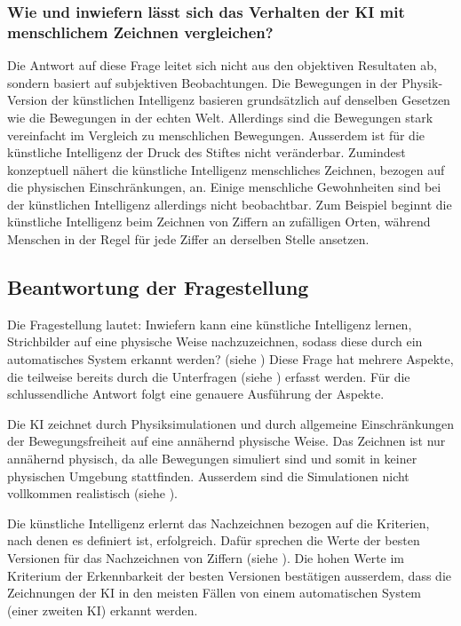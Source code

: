  
\subsubsection*{Wie und inwiefern lässt sich das Verhalten der KI mit menschlichem Zeichnen vergleichen?}\label{subsub:d_frage_unter_6}
Die Antwort auf diese Frage leitet sich nicht aus den objektiven Resultaten ab,
sondern basiert auf subjektiven Beobachtungen. Die Bewegungen in der
Physik-Version der künstlichen Intelligenz basieren grundsätzlich auf denselben
Gesetzen wie die Bewegungen in der echten Welt. Allerdings sind die Bewegungen
stark vereinfacht im Vergleich zu menschlichen Bewegungen. Ausserdem ist für die
künstliche Intelligenz der Druck des Stiftes nicht veränderbar. Zumindest
konzeptuell nähert die künstliche Intelligenz menschliches Zeichnen,
bezogen auf die physischen Einschränkungen, an. Einige menschliche Gewohnheiten
sind bei der künstlichen Intelligenz allerdings nicht beobachtbar. Zum Beispiel
beginnt die künstliche Intelligenz beim Zeichnen von Ziffern an zufälligen
Orten, während Menschen in der Regel für jede Ziffer an derselben Stelle
ansetzen.
 
 
\subsection{Beantwortung der Fragestellung}\label{sub:d_frage_frag}
Die Fragestellung lautet: Inwiefern kann eine künstliche Intelligenz lernen,
Strichbilder auf eine physische Weise nachzuzeichnen, sodass diese durch ein
automatisches System erkannt werden? (siehe ) Diese Frage
hat mehrere Aspekte, die teilweise bereits durch die Unterfragen (siehe
) erfasst werden. Für die schlussendliche Antwort
folgt eine genauere Ausführung der Aspekte.
 
Die KI zeichnet durch Physiksimulationen und durch allgemeine Einschränkungen
der Bewegungsfreiheit auf eine annähernd physische Weise. Das Zeichnen ist nur
annähernd physisch, da alle Bewegungen simuliert sind und somit in keiner
physischen Umgebung stattfinden. Ausserdem sind die Simulationen nicht vollkommen
realistisch (siehe ).
 
Die künstliche Intelligenz erlernt das Nachzeichnen bezogen auf die Kriterien,
nach denen es definiert ist, erfolgreich. Dafür sprechen die Werte der besten
Versionen für das Nachzeichnen von Ziffern (siehe ). Die
hohen Werte im Kriterium der Erkennbarkeit der besten Versionen bestätigen
ausserdem, dass die Zeichnungen der KI in den meisten Fällen von einem
automatischen System (einer zweiten KI) erkannt werden.
 
